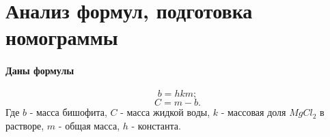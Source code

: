 \section{Анализ формул, подготовка номограммы}

\paragraph{Даны формулы}
$$b = h k m;$$
$$C = m - b.$$
Где $b$ - масса бишофита, $C$ - масса жидкой воды, $k$ - массовая доля $MgCl_2$ в растворе, $m$ - общая масса, $h$ - константа.




